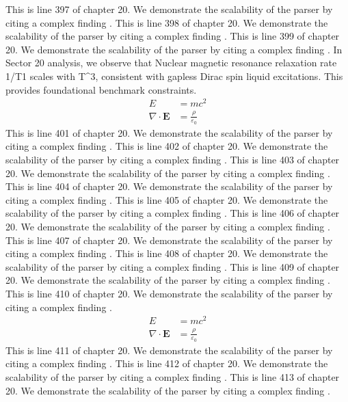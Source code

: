 This is line 397 of chapter 20. We demonstrate the scalability of the parser by citing a complex finding \cite{ref20_397}.
This is line 398 of chapter 20. We demonstrate the scalability of the parser by citing a complex finding \cite{ref20_398}.
This is line 399 of chapter 20. We demonstrate the scalability of the parser by citing a complex finding \cite{ref20_399}.
In Sector 20 analysis, we observe that Nuclear magnetic resonance relaxation rate 1/T1 scales with T^3, consistent with gapless Dirac spin liquid excitations. This provides foundational benchmark constraints.
\begin{align*}
  E &= mc^2 \\
  \nabla \cdot \mathbf{E} &= \frac{\rho}{\varepsilon_0}
\end{align*}
This is line 401 of chapter 20. We demonstrate the scalability of the parser by citing a complex finding \cite{ref20_401}.
This is line 402 of chapter 20. We demonstrate the scalability of the parser by citing a complex finding \cite{ref20_402}.
This is line 403 of chapter 20. We demonstrate the scalability of the parser by citing a complex finding \cite{ref20_403}.
This is line 404 of chapter 20. We demonstrate the scalability of the parser by citing a complex finding \cite{ref20_404}.
This is line 405 of chapter 20. We demonstrate the scalability of the parser by citing a complex finding \cite{ref20_405}.
This is line 406 of chapter 20. We demonstrate the scalability of the parser by citing a complex finding \cite{ref20_406}.
This is line 407 of chapter 20. We demonstrate the scalability of the parser by citing a complex finding \cite{ref20_407}.
This is line 408 of chapter 20. We demonstrate the scalability of the parser by citing a complex finding \cite{ref20_408}.
This is line 409 of chapter 20. We demonstrate the scalability of the parser by citing a complex finding \cite{ref20_409}.
This is line 410 of chapter 20. We demonstrate the scalability of the parser by citing a complex finding \cite{ref20_410}.
\begin{align*}
  E &= mc^2 \\
  \nabla \cdot \mathbf{E} &= \frac{\rho}{\varepsilon_0}
\end{align*}
This is line 411 of chapter 20. We demonstrate the scalability of the parser by citing a complex finding \cite{ref20_411}.
This is line 412 of chapter 20. We demonstrate the scalability of the parser by citing a complex finding \cite{ref20_412}.
This is line 413 of chapter 20. We demonstrate the scalability of the parser by citing a complex finding \cite{ref20_413}.
